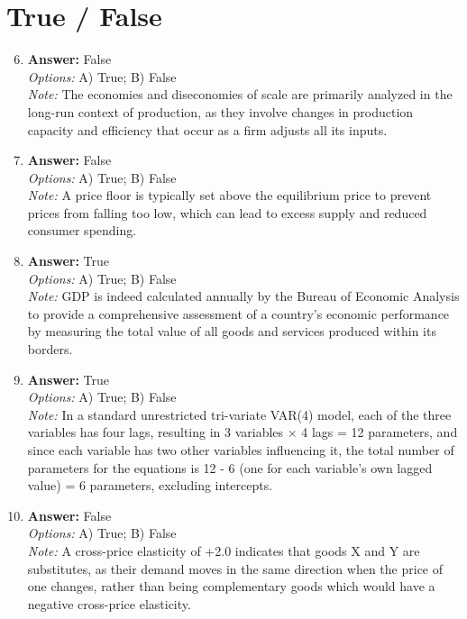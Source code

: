 \documentclass[12pt]{article}
\begin{document}
\section*{True / False}
\begin{enumerate}[label=\arabic*.]
\setcounter{enumi}{5}
\item \textbf{Answer:} False
\\ \textit{Options:} A) True; B) False
\\ \textit{Note:} The economies and diseconomies of scale are primarily analyzed in the long-run context of production, as they involve changes in production capacity and efficiency that occur as a firm adjusts all its inputs.
\item \textbf{Answer:} False
\\ \textit{Options:} A) True; B) False
\\ \textit{Note:} A price floor is typically set above the equilibrium price to prevent prices from falling too low, which can lead to excess supply and reduced consumer spending.
\item \textbf{Answer:} True
\\ \textit{Options:} A) True; B) False
\\ \textit{Note:} GDP is indeed calculated annually by the Bureau of Economic Analysis to provide a comprehensive assessment of a country's economic performance by measuring the total value of all goods and services produced within its borders.
\item \textbf{Answer:} True
\\ \textit{Options:} A) True; B) False
\\ \textit{Note:} In a standard unrestricted tri-variate VAR(4) model, each of the three variables has four lags, resulting in 3 variables × 4 lags = 12 parameters, and since each variable has two other variables influencing it, the total number of parameters for the equations is 12 - 6 (one for each variable's own lagged value) = 6 parameters, excluding intercepts.
\item \textbf{Answer:} False
\\ \textit{Options:} A) True; B) False
\\ \textit{Note:} A cross-price elasticity of +2.0 indicates that goods X and Y are substitutes, as their demand moves in the same direction when the price of one changes, rather than being complementary goods which would have a negative cross-price elasticity.
\end{enumerate}
\end{document}
